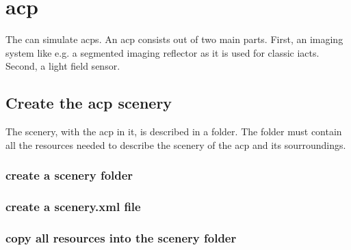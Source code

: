 \chapter{\acf{acp}}
%
The \tool{} can simulate \acp{acp}.
%
An \ac{acp} consists out of two main parts.
%
First, an imaging system like e.g. a segmented imaging reflector as it is used for classic \acp{iact}.
%
Second, a light field sensor.
%
\section{Create the \ac{acp} scenery}
The scenery, with the \ac{acp} in it, is described in a folder.
%
The folder must contain all the resources needed to describe the scenery of the \ac{acp} and its sourroundings.
%
\subsection{create a scenery folder}
%
\subsection{create a scenery.xml file}
%
\subsection{copy all resources into the scenery folder}